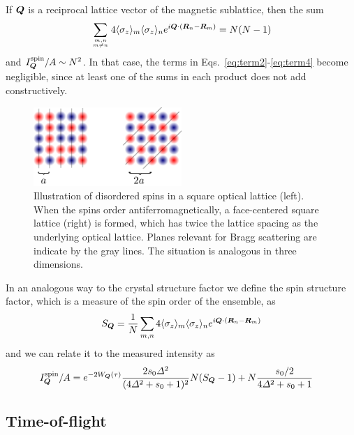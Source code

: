 If $\bm{Q}$ is a reciprocal lattice vector of the magnetic sublattice, then the
sum 
\begin{equation}
   \sumOff
  4
  \langle \sigma_{z} \rangle_{m}  \langle \sigma_{z} \rangle_{n}
  e^{ i \bv{Q} \cdot ( \bv{R}_{n} - \bv{R}_{m} ) }  =   N(N-1) 
\end{equation}
and $I_{\bm{Q}}^{\mathrm{spin}}/A \sim N^{2}$. In that case, the terms in
Eqs.~\ref{eq:term2}-\ref{eq:term4} become negligible, since at least one of the
sums in each product does not add constructively. 
\begin{figure}
    \centering
\includegraphics[width=0.5\textwidth]{../figures/braggscatt/magnetic_sublattice_2d.png}
\caption{\small  Illustration of disordered spins in a square optical lattice
(left).  When the spins order antiferromagnetically, a face-centered square
lattice (right) is formed, which has twice the lattice spacing as the
underlying optical lattice. Planes relevant for Bragg scattering are indicate
by the gray lines.  The situation is analogous in three dimensions.  }
\label{fig:magnetic-sublattice}
\end{figure}

In an analogous way to the crystal structure factor we define the spin
structure factor, which is a measure of the spin order of the ensemble, as 
\begin{equation}
 S_{\bm{Q}} = \frac{1}{N} 
   \sum_{m, n}
  4
  \langle \sigma_{z} \rangle_{m}  \langle \sigma_{z} \rangle_{n}
  e^{ i \bm{Q} \cdot ( \bm{R}_{n} - \bm{R}_{m} ) }   
\label{eq:defineSq}
\end{equation} 
and we can relate it to the measured intensity as 
\begin{equation}
\begin{split}
 I_{\bm{Q}}^{\mathrm{spin}}/A  &   = 
  e^{-2W_{\bm{Q}}(\tau)} 
\frac{  2 s_{0} \Delta^{2}}{ (4\Delta^{2} + s_{0}+1)^{2} }
  N( S_{\bm{Q}} - 1 ) +   
   N \frac{ s_{0}/2}{ 4\Delta^{2} + s_{0}+1} 
\end{split}
\end{equation}

\subsection{ Time-of-flight} 


